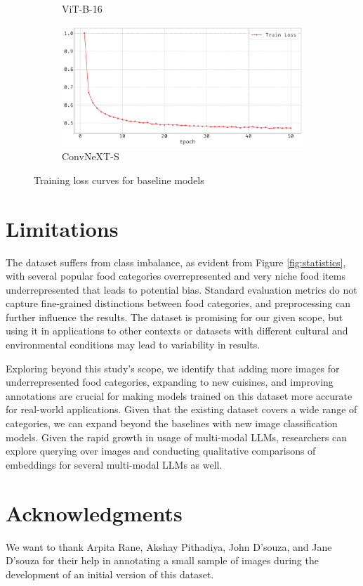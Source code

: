 \documentclass{article}
\begin{document}
\begin{figure}
\begin{subfigure}{0.45\linewidth}
    	\caption{ViT-B-16}
    	\label{fig:curve-vit}
    \end{subfigure}
    \hfill
    \begin{subfigure}{0.45\linewidth}
        \centering
    	\includegraphics[width=\linewidth]{figs/loss_curves_0_convnext_small.pdf}
    	\caption{ConvNeXT-S}
    	\label{fig:curve-convnext}
    \end{subfigure}
    \caption{Training loss curves for baseline models}
    \label{fig:list-curves}
\end{figure}

\section{Limitations}

The dataset suffers from class imbalance, as evident from Figure \ref{fig:statistics}, with several popular food categories overrepresented and very niche food items underrepresented that leads to potential bias. Standard evaluation metrics do not capture fine-grained distinctions between food categories, and preprocessing can further influence the results. The dataset is promising for our given scope, but using it in applications to other contexts or datasets with different cultural and environmental conditions may lead to variability in results.

Exploring beyond this study's scope, we identify that adding more images for underrepresented food categories, expanding to new cuisines, and improving annotations are crucial for making models trained on this dataset more accurate for real-world applications. Given that the existing dataset covers a wide range of categories, we can expand beyond the baselines with new image classification models. Given the rapid growth in usage of multi-modal LLMs, researchers can explore querying over images and conducting qualitative comparisons of embeddings for several multi-modal LLMs as well.

\section*{Acknowledgments}

We want to thank Arpita Rane, Akshay Pithadiya, John D’souza, and Jane D’souza for their help in annotating a small sample of images during the development of an initial version of this dataset. 



\end{document}
